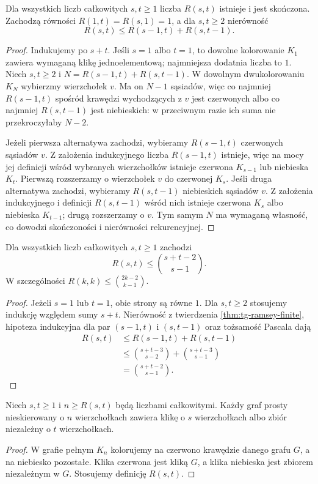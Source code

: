 \begin{twierdzenie}
\label{thm:tg-ramsey-finite}
Dla wszystkich liczb całkowitych $s,t\geq1$
liczba $R(s,t)$ istnieje i jest skończona.
Zachodzą równości
$R(1,t)=R(s,1)=1$, a dla $s,t\geq2$
nierówność
\[
R(s,t)\leq R(s-1,t)+R(s,t-1).
\]
\end{twierdzenie}
\begin{proof}
Indukujemy po $s+t$.
Jeśli $s=1$ albo $t=1$, to dowolne kolorowanie
$K_1$ zawiera wymaganą klikę jednoelementową;
najmniejsza dodatnia liczba to $1$.
Niech $s,t\geq2$ i
$N=R(s-1,t)+R(s,t-1)$.
W dowolnym dwukolorowaniu $K_N$
wybierzmy wierzchołek $v$.
Ma on $N-1$ sąsiadów,
więc co najmniej
$R(s-1,t)$ spośród krawędzi
wychodzących z $v$ jest
czerwonych albo co najmniej
$R(s,t-1)$ jest niebieskich:
w przeciwnym razie ich suma
nie przekroczyłaby $N-2$.

Jeżeli pierwsza alternatywa zachodzi, wybieramy
$R(s-1,t)$ czerwonych sąsiadów $v$.
Z założenia indukcyjnego liczba $R(s-1,t)$
istnieje, więc na mocy jej definicji wśród
wybranych wierzchołków istnieje czerwona
$K_{s-1}$ lub niebieska $K_t$.
Pierwszą rozszerzamy
o wierzchołek $v$
do czerwonej $K_s$.
Jeśli druga alternatywa zachodzi, wybieramy
$R(s,t-1)$ niebieskich sąsiadów $v$.
Z założenia indukcyjnego i definicji $R(s,t-1)$
wśród nich istnieje czerwona $K_s$ albo
niebieska $K_{t-1}$;
drugą rozszerzamy o $v$.
Tym samym $N$ ma
wymaganą własność,
co dowodzi skończoności
i nierówności rekurencyjnej.
\end{proof}

\begin{wniosek}
\label{cor:tg-ramsey-binomial}
Dla wszystkich liczb całkowitych $s,t\geq1$ zachodzi
\[
R(s,t)\leq\binom{s+t-2}{s-1}.
\]
W szczególności
$R(k,k)\leq\binom{2k-2}{k-1}$.
\end{wniosek}
\begin{proof}
Jeżeli $s=1$ lub $t=1$,
obie strony są równe $1$.
Dla $s,t\geq2$ stosujemy indukcję względem sumy
$s+t$. Nierówność z twierdzenia
\ref{thm:tg-ramsey-finite}, hipoteza indukcyjna
dla par $(s-1,t)$ i $(s,t-1)$ oraz tożsamość
Pascala dają
\[
\begin{aligned}
R(s,t)&\leq R(s-1,t)+R(s,t-1)\\
&\leq\binom{s+t-3}{s-2}+\binom{s+t-3}{s-1}\\
&=\binom{s+t-2}{s-1}.
\end{aligned}
\]
\end{proof}

\begin{stwierdzenie}
\label{prop:tg-ramsey-clique-independent}
Niech $s,t\geq1$ i $n\geq R(s,t)$ będą liczbami
całkowitymi. Każdy graf prosty nieskierowany
o $n$ wierzchołkach
zawiera klikę o $s$ wierzchołkach
albo zbiór niezależny
o $t$ wierzchołkach.
\end{stwierdzenie}
\begin{proof}
W grafie pełnym $K_n$ kolorujemy
na czerwono krawędzie
danego grafu $G$,
a na niebiesko pozostałe.
Klika czerwona jest
kliką $G$, a klika
niebieska jest
zbiorem niezależnym w $G$.
Stosujemy definicję $R(s,t)$.
\end{proof}


